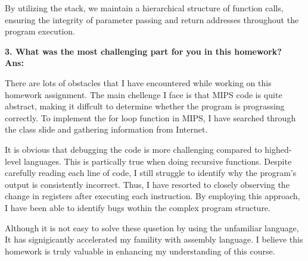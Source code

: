 \documentclass[a4paper, 12pt]{article}
\begin{document}
By utilizing the stack,
we maintain a hierarchical structure of function calls,
ensuring the integrity of parameter passing and return
addresses throughout the program execution.\\\par
{\bf 3. What was the most challenging part for you in this homework? }\\
{\bf Ans: }\par
There are lots of obstacles that I have encountered while working on this homework assignment.
The main chellenge I face is that MIPS code is quite abstract, making it diffcult to determine
whether the program is prograssing correctly.
To implement the for loop function in MIPS, I have searched through the class slide
and gathering information from Internet.\par
It is obvious that debugging
the code is more challenging compared to highed-level languages.
This is partically true when doing recursive functions.
Despite carefully reading each line of code, I still struggle to identify why
the program's output is consistently incorrect.
Thus, I have resorted to closely observing the change in registers after executing each instruction.
By employing this approach, I have been able to identify bugs wothin the complex program structure.\par
Although it is not easy to solve these qusetion by using the unfamiliar language,
It has signigicantly accelerated my famility with assembly language.
I believe this homework is truly valuable in enhancing my understanding of this course.
\end{document}
